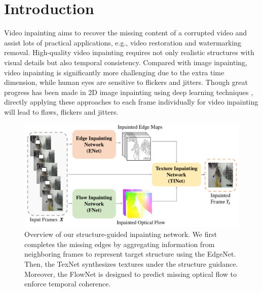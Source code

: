 

\section{Introduction}


Video inpainting aims to recover the missing content of a corrupted video and assist lots of practical applications, e.g., video restoration and watermarking removal. 
High-quality video inpainting requires not only realistic structures with visual details but also temporal consistency. 
Compared with image inpainting, video inpainting is significantly more challenging due to the extra time dimension, while human eyes are sensitive to flickers and jitters.
% 
Though great progress has been made in 2D image inpainting using deep learning techniques \cite{yu2018free,Xiong_2019_CVPR}, directly applying these approaches to each frame individually for video inpainting will lead to flaws, flickers and jitters. 

\begin{figure}[t]
	\centering
	\includegraphics[width=1.0\columnwidth]{zong} %
	\caption{Overview of our structure-guided inpainting network. We first completes the missing edges by aggregating information from neighboring frames to represent target structure using the EdgeNet. Then, the TexNet synthesizes textures under the structure guidance. Moreover, the FlowNet is designed to predict missing optical flow to enforce temporal coherence.}
	\label{zong}
\end{figure}


